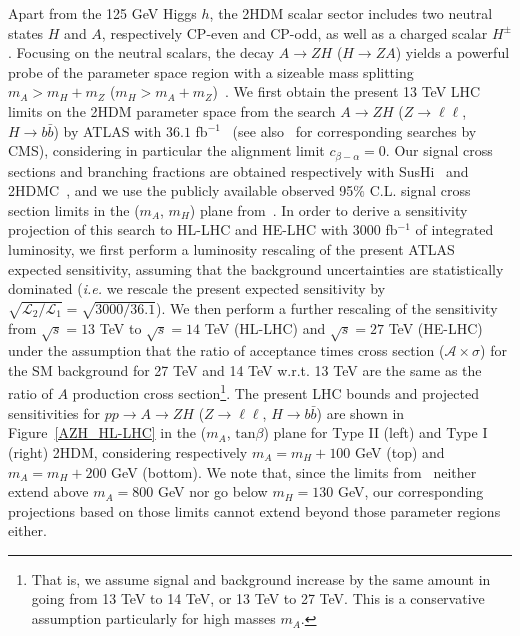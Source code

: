 Apart from the 125 GeV Higgs $h$, the 2HDM scalar sector includes two neutral states 
$H$ and $A$, respectively CP-even and CP-odd, as well as a charged scalar $H^{\pm}$.
Focusing on the neutral scalars, the decay $A \to Z H$ ($H \to Z A$) yields a powerful probe of the parameter space region with a sizeable mass splitting $m_A > m_H + m_Z$ ($m_H > m_A + m_Z$)~\cite{Coleppa:2014hxa,Dorsch:2014qja}. We first obtain the present 13 TeV LHC limits on the 2HDM parameter space from the search $A \to Z H$ ($Z\to \ell\ell$, $H \to b\bar{b}$) by ATLAS with $36.1$ fb$^{-1}$~\cite{Aaboud:2018eoy} (see also~\cite{Khachatryan:2016are,CMS:2016qxc} for 
corresponding searches by CMS), considering in particular the alignment limit $c_{\beta -\alpha} = 0$.
Our signal cross sections and branching fractions are obtained respectively with {\sc SusHi}~\cite{Harlander:2012pb} and {\sc 2HDMC}~\cite{Eriksson:2009ws}, and we use the 
publicly available observed 95$\%$ C.L. signal cross section limits in the ($m_A$, $m_H$) plane from~\cite{Aaboud:2018eoy}. In order to derive a sensitivity projection of this search to HL-LHC and HE-LHC with $3000$ fb$^{-1}$ of integrated luminosity, we first perform a luminosity rescaling of the present ATLAS expected sensitivity, assuming that the background uncertainties are statistically dominated ({\it i.e.} we rescale the present expected sensitivity by $\sqrt{\mathcal{L}_2/\mathcal{L}_1} = \sqrt{3000/36.1}$).
We then perform a further rescaling of the sensitivity from $\sqrt{s} = 13$ TeV to 
$\sqrt{s} = 14$ TeV (HL-LHC) and $\sqrt{s} = 27$ TeV (HE-LHC) under the assumption that the
ratio of acceptance times cross section ($\mathcal{A} \times \sigma$) for the SM background for 27 TeV and 14 TeV w.r.t. 13 TeV are the same as the ratio of $A$ production cross section\footnote{That is, we assume signal and background increase by the same amount in going from 13 TeV to 14 TeV, or 13 TeV to 27 TeV. This is a conservative assumption particularly for high masses $m_A$.}. 
The present LHC bounds and projected sensitivities for $p p \to A \to Z H$ ($Z\to \ell\ell$, $H \to b\bar{b}$) are shown in Figure~\ref{AZH_HL-LHC} in the ($m_A$, $\mathrm{tan}\beta$) plane for Type II (left) and Type I (right) 2HDM, considering respectively $m_A = m_H + 100$ GeV (top) and $m_A = m_H + 200$ GeV (bottom).
We note that, since the limits from~\cite{Aaboud:2018eoy} neither extend above 
$m_A = 800$ GeV nor go below $m_H = 130$ GeV, our corresponding projections based on those limits cannot 
extend beyond those parameter regions either.  

